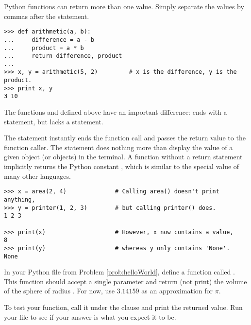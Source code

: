 Python functions can return more than one value.
Simply separate the values by commas after the  statement.

\begin{lstlisting}
>>> def arithmetic(a, b):
...     difference = a - b
...     product = a * b
...     return difference, product
...
>>> x, y = arithmetic(5, 2)         # x is the difference, y is the product.
>>> print x, y
3 10
\end{lstlisting}

\begin{info} %
The functions  and  defined above have an important difference:  ends with a  statement, but  lacks a  statement.

The  statement instantly ends the function call and passes the return value to the function caller.
The  statement does nothing more than display the value of a given object (or objects) in the terminal.
A function without a return statement implicitly returns the Python constant , which is similar to the special value  of many other languages.

\begin{lstlisting}
>>> x = area(2, 4)              # Calling area() doesn't print anything,
>>> y = printer(1, 2, 3)        # but calling printer() does.
1 2 3

>>> print(x)                    # However, x now contains a value,
8
>>> print(y)                    # whereas y only contains 'None'.
None
\end{lstlisting}
%
\end{info}

\begin{problem} %
In your Python file from Problem \ref{prob:helloWorld}, define a function called .
This function should accept a single parameter  and return (not print) the volume of the sphere of radius .
For now, use $3.14159$ as an approximation for $\pi$.

To test your function, call it under the  clause and print the returned value.
Run your file to see if your answer is what you expect it to be.
\end{problem}

